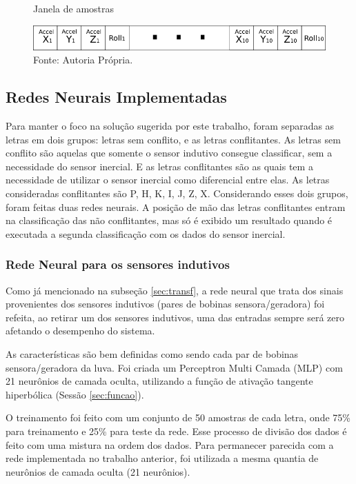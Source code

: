\begin{figure}[H]
	\vspace{4mm}
	\centering
	\caption{Janela de amostras}
	\label{fig:janela}
	\includegraphics[scale=0.7]{imagens/janela.png}
	\caption*{Fonte: Autoria Própria.}
\end{figure}

\subsection{Redes Neurais Implementadas}

Para manter o foco na solução sugerida por este trabalho, foram separadas as letras em dois grupos: letras sem conflito, e as letras conflitantes.
As letras sem conflito são aquelas que somente o sensor indutivo consegue classificar, sem a necessidade do sensor inercial. E as letras conflitantes são as quais tem a necessidade de utilizar o sensor inercial como diferencial entre elas. As letras consideradas conflitantes são P, H, K, I, J, Z, X.
Considerando esses dois grupos, foram feitas duas redes neurais. A posição de mão das letras conflitantes entram na classificação das não conflitantes, mas só é exibido um resultado quando é executada a segunda classificação com os dados do sensor inercial.

\subsubsection{Rede Neural para os sensores indutivos}
Como já mencionado na subseção \ref{sec:transf}, a rede neural que trata dos sinais provenientes dos sensores indutivos (pares de bobinas sensora/geradora) foi refeita, ao retirar um dos sensores indutivos, uma das entradas sempre será zero afetando o desempenho do sistema.

As características são bem definidas como sendo cada par de bobinas sensora/geradora da luva. Foi criada um Perceptron Multi Camada (MLP) com 21 neurônios de camada oculta, utilizando a função de ativação tangente hiperbólica (Sessão \ref{sec:funcao}). 

O treinamento foi feito com um conjunto de 50 amostras de cada letra, onde 75\% para treinamento e 25\% para teste da rede. Esse processo de divisão dos dados é feito com uma mistura na ordem dos dados. Para permanecer parecida com a rede implementada no trabalho anterior, foi utilizada a mesma quantia de neurônios de camada oculta (21 neurônios).

